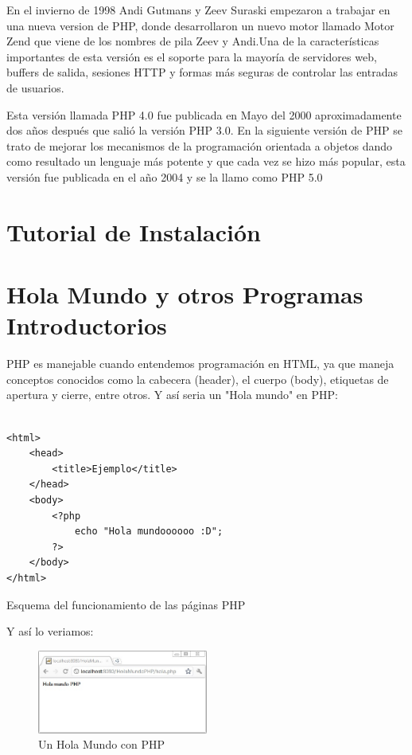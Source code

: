 \documentclass[11pt]{article} %
\begin{document}
En el invierno de 1998 Andi Gutmans y Zeev Suraski empezaron a trabajar en una nueva version de PHP, donde desarrollaron un nuevo motor llamado Motor Zend que viene de los nombres de pila Zeev y Andi.Una de la características importantes de esta versión es el soporte para la mayoría de servidores web, buffers de salida, sesiones HTTP y formas más seguras de controlar las entradas de usuarios.

Esta versión llamada PHP 4.0 fue publicada en Mayo del 2000 aproximadamente  dos años después que salió la versión PHP 3.0.
En la siguiente versión de PHP se trato de mejorar los mecanismos de la programación orientada a objetos dando como resultado un lenguaje más potente y que cada vez se hizo más popular, esta versión fue publicada en el año 2004 y se la llamo como PHP 5.0 
 

\section{Tutorial de Instalación}

\section{Hola Mundo y otros Programas Introductorios}
PHP es manejable cuando entendemos programación en HTML, ya que maneja conceptos conocidos como la cabecera (header), el cuerpo (body), etiquetas de apertura y cierre, entre otros. Y así seria un "Hola mundo" en PHP:

\begin{lstlisting}[frame=single]  % Start your code-block

<html>
    <head>
        <title>Ejemplo</title>
    </head>
    <body>
        <?php
            echo "Hola mundoooooo :D";
        ?>
    </body>
</html>
\end{lstlisting}
\begin{center}
Esquema del funcionamiento de las páginas PHP \cite{[2]}
\end{center}
Y así lo veriamos:
\begin{figure}[H]
  \centering
    \includegraphics[width=0.5\textwidth]{Imagenes/HolaMundoPHP-Navegador}
  \caption{Un Hola Mundo con PHP}
  \label{fig:funcionamiento}
\end{figure}
\end{document}
